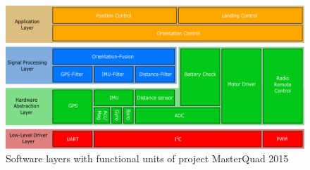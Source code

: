 \begin{figure}[H]
    \centering
    \includegraphics[width=\textwidth]{fig/ch-software-structure/Software_structure}
    \caption{Software layers with functional units of project MasterQuad 2015}
    \label{fig:layer:layer_graph}
\end{figure}


